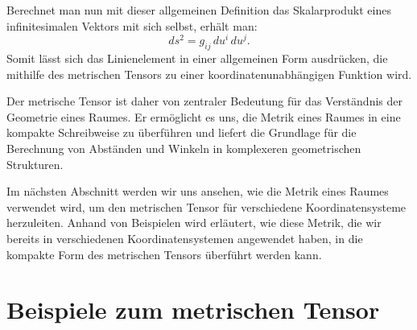 Berechnet man nun mit dieser allgemeinen Definition das Skalarprodukt eines infinitesimalen Vektors mit sich selbst, erhält man:
\begin{equation}
	ds^2 = g_{ij} \, du^i \, du^j.
\end{equation}
Somit lässt sich das Linienelement in einer allgemeinen Form ausdrücken, die mithilfe des metrischen Tensors zu einer koordinatenunabhängigen Funktion wird.

Der metrische Tensor ist daher von zentraler Bedeutung für das Verständnis der Geometrie eines Raumes.
Er ermöglicht es uns, die Metrik eines Raumes in eine kompakte Schreibweise zu überführen und liefert die Grundlage für die Berechnung von Abständen und Winkeln in komplexeren geometrischen Strukturen.

Im nächsten Abschnitt werden wir uns ansehen, wie die Metrik eines Raumes verwendet wird, um den metrischen Tensor für verschiedene Koordinatensysteme herzuleiten.
Anhand von Beispielen wird erläutert, wie diese Metrik, die wir bereits in verschiedenen Koordinatensystemen angewendet haben, in die kompakte Form des metrischen Tensors überführt werden kann.


\section{Beispiele zum metrischen Tensor}





